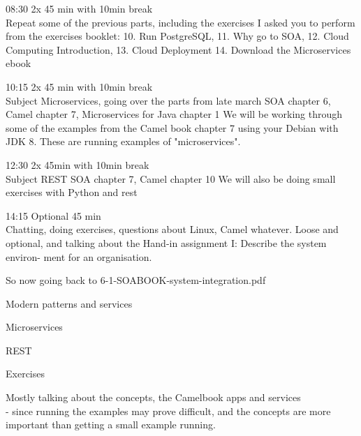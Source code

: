\documentclass[Screen16to9,17pt]{foils}
\begin{document}
\begin{list2}
\item 08:30 2x 45 min with 10min break\\
 Repeat some of the previous parts, including the exercises I asked you to perform from the exercises booklet:
10. Run PostgreSQL, 11. Why go to SOA, 12. Cloud Computing Introduction, 13. Cloud Deployment
14. Download the Microservices ebook

\item 10:15 2x 45 min with 10min break\\
 Subject Microservices, going over the parts from late march
SOA chapter 6, Camel chapter 7, Microservices for Java chapter 1
We will be working through some of the examples from the Camel book chapter 7 using your Debian with JDK 8. These are running examples of "microservices".

\item 12:30 2x 45min with 10min break \\
Subject REST
SOA chapter 7, Camel chapter 10
We will also be doing small exercises with Python and rest

\item 14:15 Optional 45 min\\
Chatting, doing exercises, questions about Linux, Camel whatever.
Loose and optional, and talking about the  Hand-in assignment I: Describe the system environ-
ment for an organisation.
\end{list2}

So now going back to 6-1-SOABOOK-system-integration.pdf



\begin{list2}
\item Modern patterns and services
\item Microservices
\item REST
\end{list2}

Exercises
\begin{list2}
\item Mostly talking about the concepts, the Camelbook apps and services\\
- since running the examples may prove difficult, and the concepts are more important than getting a small example running.
\end{list2}



\end{document}
